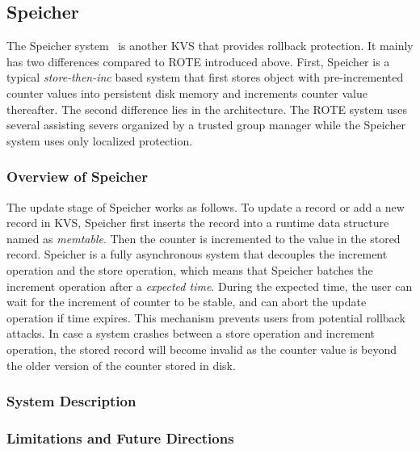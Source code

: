 \subsection{Speicher}

The Speicher system~\cite{} is another KVS that provides rollback protection.
It mainly has two differences compared to ROTE introduced above. First, 
Speicher is a typical \textit{store-then-inc} based system that first stores 
object with pre-incremented counter values into persistent disk memory and increments
counter value thereafter. The second difference lies in the architecture. The ROTE system
uses several assisting severs organized by a trusted group manager while the Speicher system 
uses only localized protection.


\subsubsection{Overview of Speicher}


The update stage of Speicher works as follows. To update a record or add a new 
record in KVS, Speicher first inserts the record into a runtime data structure
named as \textit{memtable}. Then the counter is incremented to the value in 
the stored record. Speicher is a fully asynchronous system that decouples the 
increment operation and the store operation, which means that Speicher batches
the increment operation after a \textit{expected time}. During the expected 
time, the user can wait for the increment of counter to be stable, and can 
abort the update operation if time expires. This mechanism prevents users 
from potential rollback attacks. In case a system crashes between a store
operation and increment operation, the stored record will become invalid as 
the counter value is beyond the older version of the counter stored in disk.




\subsubsection{System Description}






\subsubsection{Limitations and Future Directions}